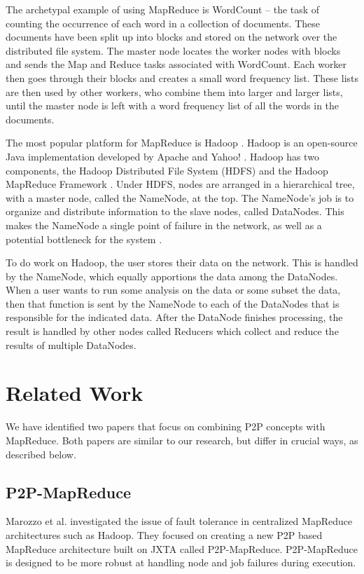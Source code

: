 The archetypal example of using MapReduce is WordCount -- the task of counting the occurrence of each word in a collection of documents.
These documents have been split up into blocks and stored on the network over the distributed file system.  
The master node locates the worker nodes with blocks and sends the Map and Reduce tasks associated with WordCount.  
Each worker then goes through their blocks and creates a small word frequency list.  
These lists are then used by other workers, who combine them into larger and larger lists, until the master node is left with a word frequency list of all the words in the documents. 

The most popular platform for MapReduce is Hadoop \cite{hadoop}. 
Hadoop is an open-source Java implementation developed by Apache and Yahoo! \cite{pavlo2009comparison}.  
Hadoop has two components, the Hadoop Distributed File System (HDFS) \cite{hdfs} and the Hadoop MapReduce Framework \cite{mrsurvey}.  
Under HDFS, nodes are arranged in a hierarchical tree, with a master node, called the NameNode, at the top.  
The NameNode's job is to organize and distribute information to the slave nodes, called DataNodes.  
This makes the NameNode a single point of failure \cite{shvachko2010hadoop} in the network, as well as a potential bottleneck for the system \cite{hadoop-bottle}.

To do work on Hadoop, the user stores their data on the network.  
This is handled by the NameNode, which equally apportions the data among the DataNodes.  
When a user wants to run some analysis on the data or some subset the data, then that function is sent by the NameNode to each of the DataNodes that is responsible for the indicated data.   
After the DataNode finishes processing, the result is handled by other nodes called Reducers which collect and reduce the results of multiple DataNodes.



\section{Related Work}

We have identified two papers that focus on combining P2P concepts with MapReduce.  Both papers are similar to our research, but differ in crucial ways, as described below.


\subsection{P2P-MapReduce}
Marozzo et al. \cite{marozzo2012p2p} investigated the issue of fault tolerance in centralized MapReduce architectures such as Hadoop.  They focused on creating a new P2P based MapReduce architecture built on JXTA \cite{jxta} called P2P-MapReduce.  P2P-MapReduce is designed to be more robust at handling node and job failures during execution.

